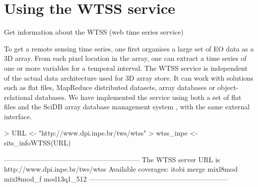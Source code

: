 \documentclass[article]{jss}
\begin{document}
\section{Using the WTSS service}

Get information about the WTSS (web time series service)

To get a remote sensing time series, one first organises a large set of
EO data as a 3D array. From each pixel location in the array, one can
extract a time series of one or more variables for a temporal interval.
The WTSS service is independent of the actual data architecture used for
3D array store. It can work with solutions such as flat files, MapReduce
distributed datasets, array databases or object-relational databases. We
have implemented the service using both a set of flat files and the
SciDB array database management system \citep{Stonebraker2013}, with the
same external interface.

\begin{CodeChunk}

\begin{CodeInput}
> URL <- "http://www.dpi.inpe.br/tws/wtss"
> wtss_inpe <- sits_infoWTSS(URL)
\end{CodeInput}

\begin{CodeOutput}
-----------------------------------------------------------
The WTSS server URL is http://www.dpi.inpe.br/tws/wtss
Available coverages: 
itobi
merge
mixl8mod
mixl8mod_f
mod13q1_512
------------------------------------------------------------
\end{CodeOutput}
\end{CodeChunk}
\end{document}
